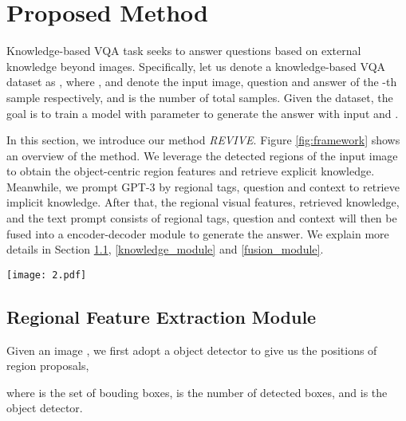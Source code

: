 \documentclass{article}
\begin{document}
\section{Proposed Method \label{sec:method}}

Knowledge-based VQA task \cite{marino2019ok} seeks to answer questions based on external knowledge beyond images. Specifically, let us denote a knowledge-based VQA dataset as , where ,  and  denote the input image, question and answer of the -th sample respectively, and  is the number of total samples. Given the dataset, the goal is to train a model with parameter  to generate the answer  with input  and . 

In this section, we introduce our method \emph{REVIVE}. Figure \ref{fig:framework} shows an overview of the method. We leverage the detected regions of the input image to obtain the object-centric region features and retrieve explicit knowledge. Meanwhile, we prompt GPT-3 \cite{brown2020language} by regional tags, question and context to retrieve implicit knowledge. After that, the regional visual features, retrieved  knowledge, and the text prompt consists of regional tags, question and context will then be fused into a encoder-decoder module to generate the answer. We explain more details in Section \ref{region_module}, \ref{knowledge_module} and \ref{fusion_module}.

\begin{figure*}
\begin{center}
\texttt{[image: 2.pdf]}
\end{center}
    \vspace{-2mm}
   \caption{\textbf{The illustration of \textit{REVIVE.}} It exploits regional information (\textit{i.e.}, features, positions and tags), question and context to retrieve different types of knowledge. In addition, it also incorporates learned object-centric region features with retrieved knowledge for answer generation.}
    \vspace{-2mm}
\label{fig:framework}
\end{figure*}

\subsection{Regional Feature Extraction Module}
\label{region_module}
Given an image , we first adopt a object detector to give us the positions of region proposals,

where  is the set of bouding boxes,  is the number of detected boxes, and  is the object detector.
\end{document}
